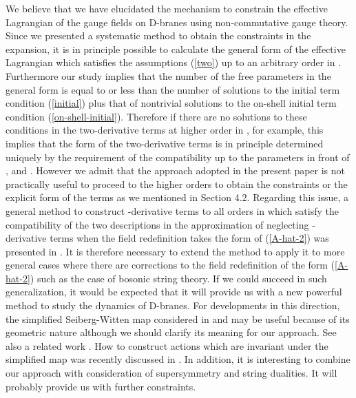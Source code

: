 \documentclass[a4paper,12pt]{article}
\begin{document}
We believe that we have elucidated the mechanism to constrain
the effective Lagrangian of the gauge fields on D-branes using
non-commutative gauge theory.
Since we presented a systematic method to obtain
the constraints in the \coordHE{} expansion,
it is in principle possible to calculate
the general form of the effective Lagrangian which satisfies
the assumptions (\ref{two})
up to an arbitrary order in \coordHE{}.
Furthermore our study implies that
the number of the free parameters in the general form
is equal to or less than the number of solutions to
the initial term condition (\ref{initial})
plus that of nontrivial solutions
to the on-shell initial term condition (\ref{on-shell-initial}).
Therefore if there are no solutions to these conditions
in the two-derivative terms at higher order in \coordHE{}, for example,
this implies that
the form of the two-derivative terms is in principle
determined uniquely by the requirement of the compatibility
up to the parameters in front of \coordHE{}, \coordHE{} and \coordHE{}.
However we admit that the approach adopted in the present paper
is not practically useful to proceed to the higher orders
to obtain the constraints
or the explicit form of the terms
as we mentioned in Section 4.2.
Regarding this issue,
a general method to construct
\coordHE{}-derivative terms to all orders in \coordHE{}
which satisfy the compatibility of the two descriptions
in the approximation of neglecting \coordHE{}-derivative terms
when the field redefinition takes the form of (\ref{A-hat-2})
was presented in \cite{Terashima}.
It is therefore necessary to extend the method
to apply it to more general cases
where there are corrections to
the field redefinition of the form (\ref{A-hat-2})
such as the case of bosonic string theory.
If we could succeed in such generalization,
it would be expected that it will provide us with
a new powerful method to study the dynamics of D-branes.
For developments in this direction,
the simplified Seiberg-Witten map considered in
\cite{Cornalba-Chiappa} and \cite{Ishibashi}
may be useful
because of its geometric nature
although we should clarify its meaning for our approach.
See also a related work \cite{Okuyama}.
How to construct actions which are invariant
under the simplified map was recently discussed in \cite{Cornalba}.
In addition, it is interesting to combine our approach
with consideration of supersymmetry and string dualities.
It will probably provide us with further constraints.
\end{document}
